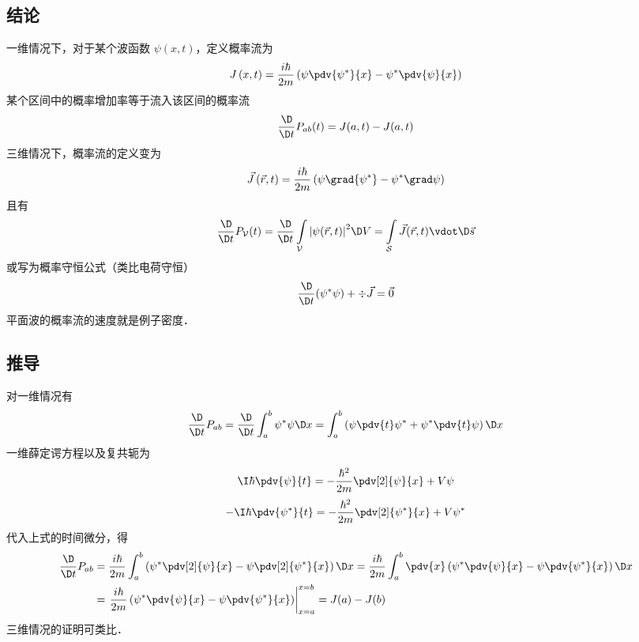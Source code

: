 

\subsection{结论}
一维情况下，对于某个波函数 $\psi \left( {x,t} \right)$，定义概率流为
\begin{equation}
J\left( {x,t} \right) = \frac{i\hbar }{2m}\left( {\psi \pdv{\psi^*}{x} - {\psi ^ * } \pdv{\psi}{x}} \right)
\end{equation}
某个区间中的概率增加率等于流入该区间的概率流
\begin{equation}
\frac{\D}{\D t}{P_{ab}}(t) = J(a,t) - J(a,t)
\end{equation}
三维情况下，概率流的定义变为
\begin{equation}
\vec J\left( {\vec r,t} \right) = \frac{i\hbar }{2m}\left( {\psi \grad {\psi ^ * } - {\psi ^ * }\grad \psi } \right)
\end{equation}
且有
\begin{equation}
\frac{\D}{\D t}{P_\mathcal{V}}(t) = \frac{\D}{\D t}\int\limits_\mathcal{V} {{{\left| {\psi (\vec r,t)} \right|}^2}\D V}  = \int\limits_\mathcal{S} {\vec J(\vec r,t) \vdot \D\vec s}
\end{equation}
或写为概率守恒公式（类比电荷守恒） %
\begin{equation}
\frac{\D}{\D t}({\psi ^ * }\psi ) + \div\vec J = \vec 0
\end{equation}
平面波的概率流的速度就是例子密度．

\subsection{推导}

对一维情况有
\begin{equation}
\frac{\D}{\D t}{P_{ab}} = \frac{\D}{\D t}\int_a^b {{\psi ^ * }\psi \D x}  = \int_a^b {\left( {\psi \pdv{t} \psi^* + {\psi ^ * } \pdv{t} \psi } \right)\D x}
\end{equation}
一维薛定谔方程以及复共轭为
\begin{equation}
\I\hbar \pdv{\psi}{t} =  - \frac{\hbar ^2}{2m} \pdv[2]{\psi}{x} + V\psi
\end{equation}
\begin{equation}
- \I\hbar \pdv{\psi^*}{t} =  - \frac{\hbar ^2}{2m} \pdv[2]{\psi^*}{x} + V{\psi^* }
\end{equation}
代入上式的时间微分，得
\begin{equation}
\begin{aligned}
\frac{\D}{\D t}{P_{ab}} &= \frac{i\hbar }{2m}\int_a^b {\left( {{\psi ^ * } \pdv[2]{\psi}{x} - \psi \pdv[2]{\psi^*}{x}} \right)\D x}  = \frac{i\hbar }{2m}\int_a^b {\pdv{x} \left( {{\psi ^ * }\pdv{\psi}{x} - \psi \pdv{\psi^*}{x}} \right)\D x} \\
   &= \left. {\frac{i\hbar }{2m}\left( {{\psi ^ * }\pdv{\psi}{x} - \psi \pdv{\psi^*}{x}} \right)} \right|_{x = a}^{x = b} = J(a) - J(b)
\end{aligned}
\end{equation}
三维情况的证明可类比．

